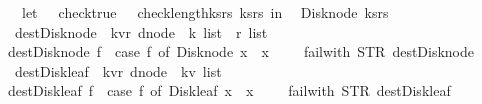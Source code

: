 \begin{isabellebody}
\ \ let\ {\isacharunderscore}\ {\isacharequal}\ check{\isacharunderscore}true\ {\isacharparenleft}{\isacharpercent}\ {\isacharunderscore}{\isachardot}\ check{\isacharunderscore}length{\isacharunderscore}ks{\isacharunderscore}rs\ ks{\isacharunderscore}rs{\isacharparenright}\ in\isanewline
\ \ {\isacharparenleft}Disk{\isacharunderscore}node\ {\isacharparenleft}ks{\isacharunderscore}rs{\isacharparenright}{\isacharparenright}{\isacharparenright}{\isachardoublequoteclose}\isanewline
\isanewline
\isanewline
\isanewline
{}\isamarkupfalse%
\ dest{\isacharunderscore}Disk{\isacharunderscore}node\ {\isacharcolon}{\isacharcolon}\ {\isachardoublequoteopen}{\isacharparenleft}{\isacharprime}k{\isacharcomma}{\isacharprime}v{\isacharcomma}{\isacharprime}r{\isacharparenright}\ dnode\ {\isasymRightarrow}\ {\isacharparenleft}{\isacharprime}k\ list\ {\isacharasterisk}\ {\isacharprime}r\ list{\isacharparenright}{\isachardoublequoteclose}\ \isanewline
{\isachardoublequoteopen}dest{\isacharunderscore}Disk{\isacharunderscore}node\ f\ {\isacharequal}\ {\isacharparenleft}case\ f\ of\ Disk{\isacharunderscore}node\ x\ {\isasymRightarrow}\ x\ \ {\isacharbar}\ {\isacharunderscore}\ {\isasymRightarrow}\ failwith\ {\isacharparenleft}STR\ {\isacharprime}{\isacharprime}dest{\isacharunderscore}Disk{\isacharunderscore}node{\isacharprime}{\isacharprime}{\isacharparenright}{\isacharparenright}{\isachardoublequoteclose}\isanewline
\isanewline
{}\isamarkupfalse%
\ dest{\isacharunderscore}Disk{\isacharunderscore}leaf\ {\isacharcolon}{\isacharcolon}\ {\isachardoublequoteopen}{\isacharparenleft}{\isacharprime}k{\isacharcomma}{\isacharprime}v{\isacharcomma}{\isacharprime}r{\isacharparenright}\ dnode\ {\isasymRightarrow}\ {\isacharparenleft}{\isacharprime}k{\isacharasterisk}{\isacharprime}v{\isacharparenright}\ list{\isachardoublequoteclose}\ \isanewline
{\isachardoublequoteopen}dest{\isacharunderscore}Disk{\isacharunderscore}leaf\ f\ {\isacharequal}\ {\isacharparenleft}case\ f\ of\ Disk{\isacharunderscore}leaf\ x\ {\isasymRightarrow}\ x\ \ {\isacharbar}\ {\isacharunderscore}\ {\isasymRightarrow}\ failwith\ {\isacharparenleft}STR\ {\isacharprime}{\isacharprime}dest{\isacharunderscore}Disk{\isacharunderscore}leaf{\isacharprime}{\isacharprime}{\isacharparenright}{\isacharparenright}{\isachardoublequoteclose}\isanewline
\isanewline
\isanewline
\isanewline
\isanewline
\isanewline
\isanewline
\isanewline
\isanewline
\isanewline
\isanewline
\isanewline
\isanewline
%
\isadelimtheory
\isanewline
%
\endisadelimtheory
%
\isatagtheory
{}\isamarkupfalse%
%
\endisatagtheory
{\isafoldtheory}%
%
\isadelimtheory
%
\endisadelimtheory
\end{isabellebody}%
